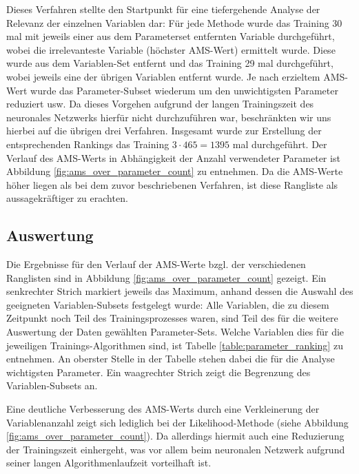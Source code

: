 Dieses Verfahren stellte den Startpunkt für eine tiefergehende Analyse der Relevanz der einzelnen Variablen dar: Für jede Methode wurde das Training 30 mal mit jeweils einer aus dem Parameterset entfernten Variable durchgeführt, wobei die irrelevanteste Variable (höchster AMS-Wert) ermittelt wurde. Diese wurde aus dem Variablen-Set entfernt und das Training 29 mal durchgeführt, wobei jeweils eine der übrigen Variablen entfernt wurde. Je nach erzieltem AMS-Wert wurde das Parameter-Subset wiederum um den unwichtigsten Parameter reduziert usw. Da dieses Vorgehen aufgrund der langen Trainingszeit des neuronales Netzwerks hierfür nicht durchzuführen war, beschränkten wir uns hierbei auf die übrigen drei Verfahren. Insgesamt wurde zur Erstellung der entsprechenden Rankings das Training $3\cdot465=1395$ mal durchgeführt. Der Verlauf des AMS-Werts in Abhängigkeit der Anzahl verwendeter Parameter ist  Abbildung \ref{fig:ams_over_parameter_count} zu entnehmen. Da die AMS-Werte höher liegen als bei dem zuvor beschriebenen Verfahren, ist diese Rangliste als aussagekräftiger zu erachten.


\subsection{Auswertung}

Die Ergebnisse für den Verlauf der AMS-Werte bzgl. der verschiedenen Ranglisten sind in Abbildung \ref{fig:ams_over_parameter_count} gezeigt. Ein senkrechter Strich markiert jeweils das Maximum, anhand dessen die Auswahl des geeigneten Variablen-Subsets festgelegt wurde: Alle Variablen, die zu diesem Zeitpunkt noch Teil des Trainingsprozesses waren, sind Teil des für die weitere Auswertung der Daten gewählten Parameter-Sets. Welche Variablen dies für die jeweiligen Trainings-Algorithmen sind, ist Tabelle \ref{table:parameter_ranking} zu entnehmen. An oberster Stelle in der Tabelle stehen dabei die für die Analyse wichtigsten Parameter. Ein waagrechter Strich zeigt die Begrenzung des Variablen-Subsets an. 

Eine deutliche Verbesserung des AMS-Werts durch eine Verkleinerung der Variablenanzahl zeigt sich lediglich bei der Likelihood-Methode (siehe Abbildung \ref{fig:ams_over_parameter_count}). Da allerdings hiermit auch eine Reduzierung der Trainingszeit einhergeht, was vor allem beim neuronalen Netzwerk aufgrund seiner langen Algorithmenlaufzeit vorteilhaft ist.


